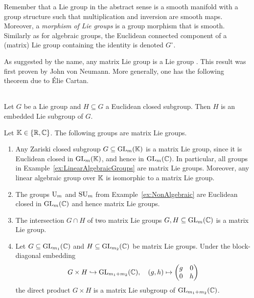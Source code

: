 Remember that a Lie group in the abstract sense is a smooth manifold with a group structure such that multiplication and inversion are smooth maps. Moreover, a \emph{morphism of Lie groups} is a group morphism that is smooth. Similarly as for algebraic groups, the Euclidean connected component of a (matrix) Lie group containing the identity is denoted $G^\circ$. 

As suggested by the name, any matrix Lie group is a Lie group \cite[Corollary~3.45]{HallBook}. This result was first proven by John von Neumann. More generally, one has the following theorem due to \'Elie Cartan.

\begin{theorem} \label{thm:ClosedSubgroup}
	\ \\
	Let $G$ be a Lie group and $H \subseteq G$ a Euclidean closed subgroup. Then $H$ is an embedded Lie subgroup of $G$.
\end{theorem}


\begin{example}\label{ex:MatrixLieGroup}
	Let $\mathbb K \in \{\mathbb R, \mathbb C\}$. The following groups are matrix Lie groups.
	\begin{enumerate}
		\item \label{item:MatrixLieZClosed}
		Any Zariski closed subgroup $G \subseteq \operatorname{GL}_m(\mathbb K)$ is a matrix Lie group, since it is Euclidean closed in $\operatorname{GL}_m(\mathbb K)$, and hence in $\operatorname{GL}_m(\mathbb C)$. In particular, all groups in Example~\ref{ex:LinearAlgebraicGroups} are matrix Lie groups.  Moreover, any linear algebraic group over $\mathbb K$ is isomorphic to a matrix Lie group. 
		
		\item The groups $\operatorname{U}_m$ and $\operatorname{SU}_m$ from Example~\ref{ex:NonAlgebraic} are Euclidean closed in $\operatorname{GL}_m(\mathbb C)$ and hence matrix Lie groups.
		
		\item The intersection $G \cap H$ of two matrix Lie groups $G,H \subseteq \operatorname{GL}_m(\mathbb C)$ is a matrix Lie group.
		
		\item \label{item:DirectProductMatrixLie}
		Let $G \subseteq \operatorname{GL}_{m_1}(\mathbb C)$ and $H \subseteq \operatorname{GL}_{m_2}(\mathbb C)$ be matrix Lie groups. Under the block-diagonal embedding
			\[ G \times H \hookrightarrow \operatorname{GL}_{m_1 + m_2}(\mathbb C), \quad (g,h) \mapsto \begin{pmatrix} g & 0 \\ 0 & h\end{pmatrix} \]
		the direct product $G \times H$ is a matrix Lie subgroup of $\operatorname{GL}_{m_1 + m_2}(\mathbb C)$.
		\hfill\exSymbol
	\end{enumerate}
\end{example}

